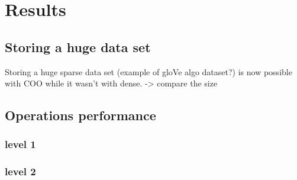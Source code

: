 \chapter{Results}

\section{Storing a huge data set}
Storing a huge sparse data set (example of gloVe algo dataset?) is now possible with COO while it wasn't with dense. 
-> compare the size

\section{Operations performance}
\subsection{level 1}
\subsection{level 2}